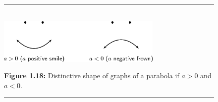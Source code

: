 \setcounter{subfigure}{0}
\begin{figure}[H] %
\begin{center}
\rule[.1in]{\figurerulewidth}{.005in} \\
\label{m39345*uid115!!!underscore!!!media}\label{m39345*uid115!!!underscore!!!printimage}\includegraphics[width=300px]{col11306.imgs/m39345_MG10C11_014.png} %
\vspace{2pt}
\vspace{\rubberspace}\par \begin{cnxcaption}
\small \textbf{Figure 1.18: }Distinctive shape of graphs of a parabola if $a>0$ and $a<0$.
\end{cnxcaption}
\vspace{.1in}
\rule[.1in]{\figurerulewidth}{.005in} \\
\end{center}
\end{figure}       


